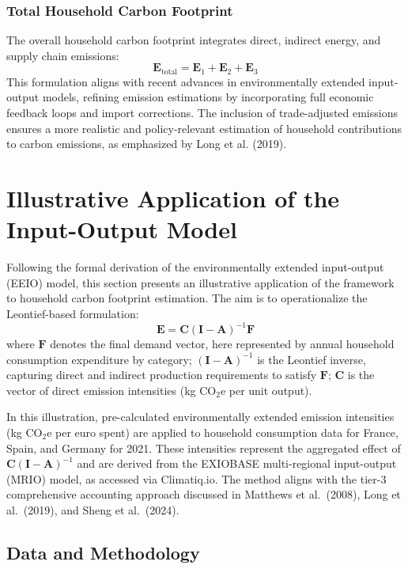 \documentclass[12pt,a4paper]{article}%
\begin{document}
\subsubsection*{Total Household Carbon Footprint}
The overall household carbon footprint integrates direct, indirect energy, and supply chain emissions:
\begin{equation}
    \mathbf{E}_{\text{total}} = \mathbf{E}_1 + \mathbf{E}_2 + \mathbf{E}_3
\end{equation}
This formulation aligns with recent advances in environmentally extended input-output models, refining emission estimations by incorporating full economic feedback loops and import corrections. The inclusion of trade-adjusted emissions ensures a more realistic and policy-relevant estimation of household contributions to carbon emissions, as emphasized by Long et al. (2019).
\section{Illustrative Application of the Input-Output Model}

Following the formal derivation of the environmentally extended input-output (EEIO) model, this section presents an illustrative application of the framework to household carbon footprint estimation. The aim is to operationalize the Leontief-based formulation:
\[
\mathbf{E} = \mathbf{C} (\mathbf{I}-\mathbf{A})^{-1} \mathbf{F}
\]
where $\mathbf{F}$ denotes the final demand vector, here represented by annual household consumption expenditure by category; ${(\mathbf{I}-\mathbf{A})}^{-1}$ is the Leontief inverse, capturing direct and indirect production requirements to satisfy $\mathbf{F}$; $\mathbf{C}$ is the vector of direct emission intensities (kg CO$_{2}$e per unit output).

In this illustration, pre-calculated environmentally extended emission intensities (kg CO$_{2}$e per euro spent) are applied to household consumption data for France, Spain, and Germany for 2021. These intensities represent the aggregated effect of $\mathbf{C} {(\mathbf{I}-\mathbf{A})}^{-1}$ and are derived from the EXIOBASE multi-regional input-output (MRIO) model, as accessed via Climatiq.io. The method aligns with the tier-3 comprehensive accounting approach discussed in Matthews et al.~(2008), Long et al.~(2019), and Sheng et al.~(2024).

\subsection{Data and Methodology}
\end{document}
